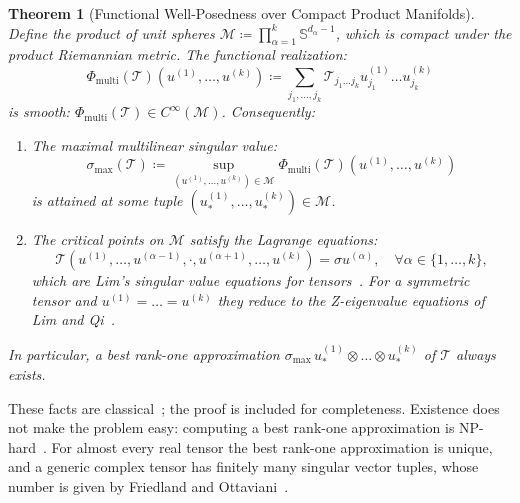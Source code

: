 \documentclass[11pt,a4paper,reqno]{amsart}
\newtheorem{theorem}{Theorem}[section]
\theoremstyle{definition}
\numberwithin{equation}{section}
\newcommand{\Sph}{\mathbb{S}}
\begin{document}
\begin{theorem}[Functional Well-Posedness over Compact Product Manifolds]
\label{thm:tensor_weierstrass}
Define the product of unit spheres $\mathcal{M} \coloneqq \prod_{\alpha=1}^k \Sph^{d_\alpha - 1}$, which is compact under the product Riemannian metric. The functional realization:
\begin{equation}
    \Phi_{\mathrm{multi}}(\mathcal{T})(u^{(1)}, \dots, u^{(k)}) \coloneqq \sum_{j_1, \dots, j_k} \mathcal{T}_{j_1 \dots j_k} u_{j_1}^{(1)} \dots u_{j_k}^{(k)}
\end{equation}
is smooth: $\Phi_{\mathrm{multi}}(\mathcal{T}) \in C^\infty(\mathcal{M})$. Consequently:
\begin{enumerate}[label=(\roman*)]
    \item The maximal multilinear singular value:
    \begin{equation}
        \sigma_{\max}(\mathcal{T}) \coloneqq \sup_{(u^{(1)}, \dots, u^{(k)}) \in \mathcal{M}} \Phi_{\mathrm{multi}}(\mathcal{T})(u^{(1)}, \dots, u^{(k)})
    \end{equation}
    is attained at some tuple $(u_*^{(1)}, \dots, u_*^{(k)}) \in \mathcal{M}$.
    \item The critical points on $\mathcal{M}$ satisfy the Lagrange equations:
    \begin{equation}
        \label{eq:tensor_critical}
        \mathcal{T}(u^{(1)}, \dots, u^{(\alpha-1)}, \cdot, u^{(\alpha+1)}, \dots, u^{(k)}) = \sigma u^{(\alpha)}, \quad \forall \alpha \in \{1, \dots, k\},
    \end{equation}
    which are Lim's singular value equations for tensors~\cite{lim2005singular}. For a symmetric tensor and $u^{(1)} = \dots = u^{(k)}$ they reduce to the Z-eigenvalue equations of Lim and Qi~\cite{lim2005singular,qi2005eigenvalues}.
\end{enumerate}
In particular, a best rank-one approximation $\sigma_{\max}\, u_*^{(1)} \otimes \dots \otimes u_*^{(k)}$ of $\mathcal{T}$ always exists.
\end{theorem}
These facts are classical~\cite{lim2005singular}; the proof is included for completeness. Existence does not make the problem easy: computing a best rank-one approximation is NP-hard~\cite{hillar2013most}. For almost every real tensor the best rank-one approximation is unique, and a generic complex tensor has finitely many singular vector tuples, whose number is given by Friedland and Ottaviani~\cite{friedland2014number}.
\end{document}
